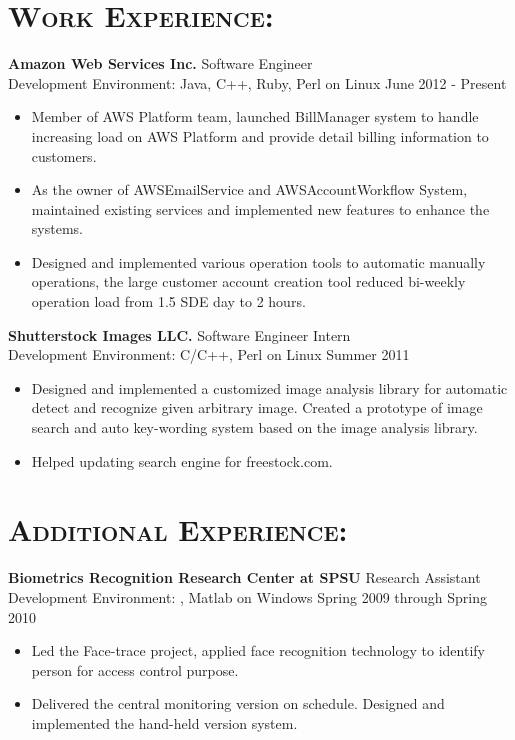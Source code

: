 \begin{resume}
\section{\textsc{Work Experience:}}
\textbf{Amazon Web Services Inc.} \hfill Software Engineer\\
Development Environment: Java, C++, Ruby, Perl on Linux \hfill June 2012 - Present
\begin{itemize}
	\item Member of AWS Platform team, launched BillManager system to handle increasing load on AWS Platform and provide  detail billing information to customers.
	\item As the owner of AWSEmailService and AWSAccountWorkflow System, maintained existing services and implemented new features to enhance the systems.
	\item Designed and implemented various operation tools to automatic manually operations, the large customer account creation tool reduced bi-weekly operation load from 1.5 SDE day to 2 hours. 
\end{itemize}
\textbf{Shutterstock Images LLC.} \hfill Software Engineer Intern\\
Development Environment: C/C++, Perl on Linux \hfill Summer 2011
\begin{itemize}
    \item Designed and implemented a customized image analysis library for automatic detect and recognize given arbitrary image. Created a prototype of image search and auto key-wording system based on the image analysis library.
    \item Helped updating search engine for freestock.com.
\end{itemize}


\section{\textsc{Additional Experience:}}
\textbf{Biometrics Recognition Research Center at SPSU} \hfill Research Assistant\\
Development Environment: \CSharp, Matlab on Windows \hfill Spring 2009 through Spring 2010 
\begin{itemize}
 	\item Led the Face-trace project, applied face recognition technology to identify person for access control purpose.
	\item Delivered the central monitoring version on schedule. Designed and implemented the hand-held version system.    
\end{itemize}


\end{resume}
